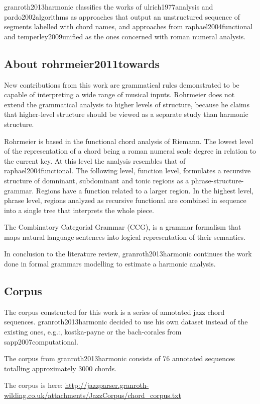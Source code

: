     granroth2013harmonic classifies the works of ulrich1977analysis and pardo2002algorithms as approaches that output an unstructured sequence of segments labelled with chord names, and approaches from raphael2004functional and temperley2009unified as the ones concerned with roman numeral analysis.

  \subsection{About rohrmeier2011towards}
    New contributions from this work are grammatical rules demonstrated to be capable of interpreting a wide range of musical inputs. Rohrmeier does not extend the grammatical analysis to higher levels of structure, because he claims that higher-level structure should be viewed as a separate study than harmonic structure.

    Rohrmeier is based in the functional chord analysis of Riemann. The lowest level of the representation of a chord being a roman numeral scale degree in relation to the current key. At this level the analysis resembles that of raphael2004functional. The following level, function level, formulates a recursive structure of domninant, subdominant and tonic regions as a phrase-structure-grammar. Regions have a function related to a larger region. In the highest level, phrase level, regions analyzed as recursive functional are combined in sequence into a single tree that interprets the whole piece.

    The Combinatory Categorial Grammar (CCG), is a grammar formalism that maps natural language sentences into logical representation of their semantics.

    In conclusion to the literature review, granroth2013harmonic continues the work done in formal grammars modelling to estimate a harmonic analysis.

  \subsection{Corpus}
    The corpus constructed for this work is a series of annotated jazz chord sequences. granroth2013harmonic decided to use his own dataset instead of the existing ones, e.g.:, kostka-payne or the bach-corales from sapp2007computational.

    The corpus from granroth2013harmonic consists of 76 annotated sequences totalling approximately 3000 chords.

    The corpus is here:\newline
    \url{http://jazzparser.granroth-wilding.co.uk/attachments/JazzCorpus/chord_corpus.txt}

